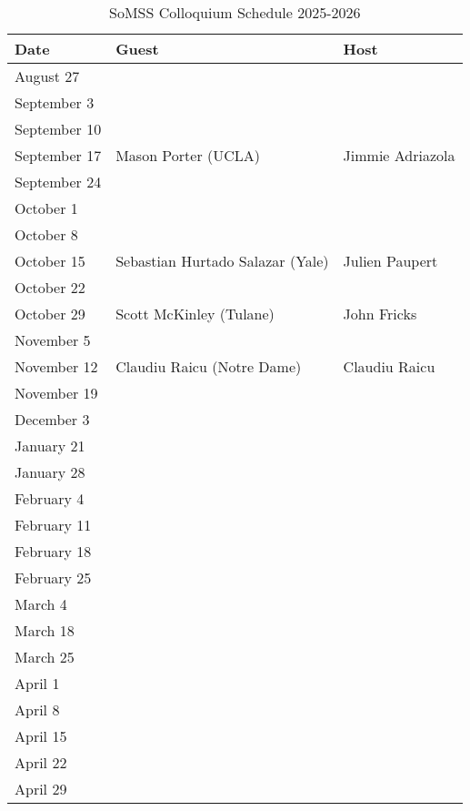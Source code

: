\documentclass[11pt]{article}
\begin{document}
\begin{table}[htp]
\caption{SoMSS Colloquium Schedule 2025-2026}
\begin{center}
\begin{tabular}{|l|l|l|}
\hline
Date & Guest & Host\\
\hline
August 27 &&\\
September 3 &&\\
September 10 &&\\
September 17 & Mason Porter (UCLA) & Jimmie Adriazola \\
September 24 &&\\
October 1 && \\
October 8 &&\\
October 15 &Sebastian Hurtado Salazar (Yale)& Julien Paupert\\
October 22 &&\\
October 29 &Scott McKinley (Tulane)& John Fricks\\
November 5 &&\\
November 12 &Claudiu Raicu (Notre Dame)& Claudiu Raicu \\
November 19 && \\
December 3 && \\
January 21 && \\
January 28 &&\\
February 4 && \\
February 11 && \\
February 18 &&\\
February 25 && \\
March 4 &&\\
March 18 && \\
March 25 && \\
April 1 && \\
April 8 &&\\
April 15 && \\
April 22 && \\
April 29 && \\
\hline
\end{tabular}
\end{center}
\end{table}%
\end{document}
